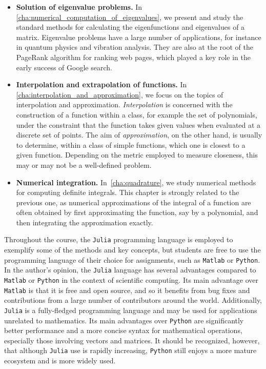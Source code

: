 \begin{itemize}
    \item
        \textbf{Solution of eigenvalue problems.}
        In \cref{cha:numerical_computation_of_eigenvalues},
        we present and study the standard methods for calculating the eigenfunctions and eigenvalues of a matrix.
        Eigenvalue problems have a large number of applications,
        for instance in quantum physics and vibration analysis.
        They are also at the root of the PageRank algorithm for ranking web pages,
        which played a key role in the early success of Google search.

    \item
        \textbf{Interpolation and extrapolation of functions.}
        In \cref{cha:interpolation_and_approximation},
        we focus on the topics of interpolation and approximation.
        \emph{Interpolation} is concerned with the construction of a function within a class,
        for example the set of polynomials,
        under the constraint that the function takes given values when evaluated at a discrete set of points.
        The aim of \emph{approximation}, on the other hand,
        is usually to determine, within a class of simple functions,
        which one is closest to a given function.
        Depending on the metric employed to measure closeness,
        this may or may not be a well-defined problem.

    \item
        \textbf{Numerical integration.}
        In~\cref{cha:quadrature},
        we study numerical methods for computing definite integrals.
        This chapter is strongly related to the previous one,
        as numerical approximations of the integral of a function are often obtained by first approximating the function,
        say by a polynomial, and then integrating the approximation exactly.
\end{itemize}

Throughout the course, the \texttt{Julia} programming language is employed to exemplify some of the methods and key concepts,
but students are free to use the programming language of their choice for assignments, such as \texttt{Matlab} or \texttt{Python}.
In the author's opinion,
the \texttt{Julia} language has several advantages compared to \texttt{Matlab} or \texttt{Python} in the context of scientific computing.
%
Its main advantage over \texttt{Matlab} is that it is free and open source,
and so it benefits from bug fixes and contributions from a large number of contributors around the world.
Additionally, \texttt{Julia} is a fully-fledged programming language and may be used for applications unrelated to mathematics.
%
Its main advantages over \texttt{Python} are significantly better performance and a more concise syntax for mathematical operations,
especially those involving vectors and matrices.
It should be recognized, however, that although \texttt{Julia} use is rapidly increasing,
\texttt{Python} still enjoys a more mature ecosystem and is more widely used.


